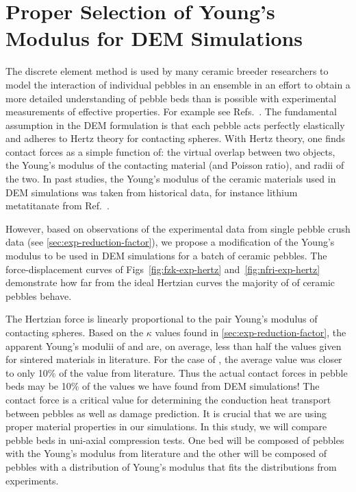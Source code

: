\section{Proper Selection of Young's Modulus for DEM Simulations}\label{sec:dem-studies-youngs-modulus}

The discrete element method is used by many ceramic breeder researchers to model the interaction of individual pebbles in an ensemble in an effort to obtain a more detailed understanding of pebble beds than is possible with experimental measurements of effective properties. For example see Refs.~\cite{An20071393, Lu2000, Zhao2010, Gan:2010uq, Annabattula2012a, VanLew2014}. The fundamental assumption in the DEM formulation is that each pebble acts perfectly elastically and adheres to Hertz theory for contacting spheres. With Hertz theory, one finds contact forces as a simple function of: the virtual overlap between two objects, the Young's modulus of the contacting material (and Poisson ratio), and radii of the two. In past studies, the Young's modulus of the ceramic materials  used in DEM simulations was taken from historical data, for instance lithium metatitanate from Ref.~\cite{Gierszewski1998}.

However, based on observations of the experimental data from single pebble crush data (see \cref{sec:exp-reduction-factor}), we propose a modification of the Young's modulus to be used in DEM simulations for a batch of ceramic pebbles. The force-displacement curves of Figs~\ref{fig:fzk-exp-hertz} and~\ref{fig:nfri-exp-hertz} demonstrate how far from the ideal Hertzian curves the majority of of ceramic pebbles behave.

The Hertzian force is linearly proportional to the pair Young's modulus of contacting spheres. Based on the $\kappa$ values found in \cref{sec:exp-reduction-factor}, the apparent Young's modulii of \lis and \lit are, on average, less than half the values given for sintered materials in literature. For the case of \lit, the average value was closer to only 10\% of the value from literature. Thus the actual contact forces in pebble beds may be 10\% of the values we have found from DEM simulations! The contact force is a critical value for determining the conduction heat transport between pebbles as well as damage prediction. It is crucial that we are using proper material properties in our simulations. In this study, we will compare pebble beds in uni-axial compression tests. One bed will be composed of pebbles with the Young's modulus from literature and the other will be composed of pebbles with a distribution of Young's modulus that fits the distributions from experiments.



